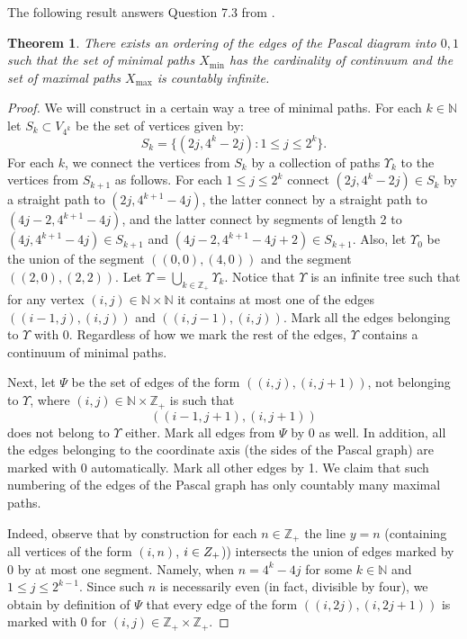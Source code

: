 \documentclass[11pt, twoside]{amsart}
\theoremstyle{definition}
\theoremstyle{remark}
\theoremstyle{plain}
\newtheorem{thm}[definition]{Theorem}
\numberwithin{equation}{section}
\begin{document}
The following result answers Question 7.3 from \cite{Fricketal2017}.
\begin{thm}\label{thm: continuum Xmin countable Xmax} There exists an ordering of the edges of the Pascal diagram into $0,1$ such that the set of minimal paths $X_{\min}$ has the cardinality of continuum and the set of maximal paths $X_{\max}$ is countably infinite.
\end{thm}
\begin{proof}
    We will construct in a certain way a tree of minimal paths. For each $k\in\mathbb N$ let $S_k\subset V_{4^k}$ be the set of vertices given by:
    $$S_k=\{(2j,4^k-2j):1\leqslant j\leqslant 2^k\}.$$ For each $k$, we connect the vertices from $S_k$ by a collection of paths $\Upsilon_k$ to the vertices from $S_{k+1}$ as follows. For each $1\leqslant j\leqslant 2^k$ connect $(2j,4^k-2j)\in S_k$ by a straight path to $(2j,4^{k+1}-4j)$, the latter connect by a straight path to $(4j-2,4^{k+1}-4j)$, and the latter connect by segments of length 2 to $(4j,4^{k+1}-4j)\in S_{k+1}$ and $(4j-2,4^{k+1}-4j+2)\in S_{k+1}$. Also, let $\Upsilon_0$ be the union of the segment $((0,0),(4,0))$ and the segment $((2,0),(2,2))$. Let $\Upsilon=\bigcup\limits_{k\in\mathbb Z_+}\Upsilon_k$. Notice that $\Upsilon$ is an infinite tree such that for any vertex $(i,j)\in\mathbb N\times\mathbb N$ it contains at most one of the edges $((i-1,j),(i,j))$ and $((i,j-1),(i,j))$. Mark all the edges belonging to $\Upsilon$ with 0. Regardless of how we mark the rest of the edges, $\Upsilon$ contains a continuum of minimal paths.

    Next, let $\Psi$ be the set of edges of the form $((i,j),(i,j+1))$,  not belonging to $\Upsilon$, where $(i,j)\in \mathbb N\times\mathbb Z_+$ is such that $$((i-1,j+1),(i,j+1))$$ does not belong to $\Upsilon$ either. Mark all edges from $\Psi$ by 0 as well. In addition, all the edges belonging to the coordinate axis (the sides of the Pascal graph) are marked with 0 automatically. Mark all other edges by 1. We claim that such numbering of the edges of the Pascal graph has only countably many maximal paths.

    Indeed, observe that by construction for each $n\in\mathbb Z_+$ the line $y=n$ (containing all vertices of the form $(i,n)$, $i\in\mathbb \mathbb Z_+$)) intersects the union of edges marked by 0 by at most one segment. Namely, when $n=4^k-4j$ for some $k\in\mathbb N$ and $1\leqslant j\leqslant 2^{k-1}$. Since such $n$ is necessarily even (in fact, divisible by four), we obtain by definition of $\Psi$ that every edge of the form $((i,2j),(i,2j+1))$ is marked with 0 for $(i,j)\in\mathbb Z_+\times\mathbb Z_+$.
    

\end{proof}
\end{document}
